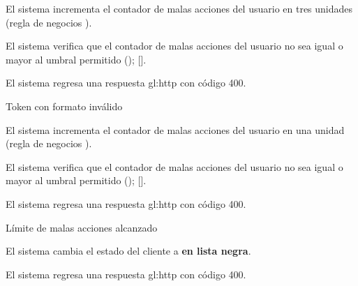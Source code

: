 {\begin{trayectoriaAlternativa}
    \item El sistema incrementa el contador de malas acciones del usuario
      en tres unidades (regla de negocios
      ).
    \item El sistema verifica que el contador de malas acciones del usuario no
      sea igual o mayor al umbral permitido
      ();
      [].

    \item El sistema regresa una respuesta \gls{gl:http} con código 400.

  \end{trayectoriaAlternativa}


  \begin{trayectoriaAlternativa}
    {Token con formato inválido}

    \item El sistema incrementa el contador de malas acciones del usuario
      en una unidad (regla de negocios ).
    \item El sistema verifica que el contador de malas acciones del usuario no
      sea igual o mayor al umbral permitido
      ();
      [].

    \item El sistema regresa una respuesta \gls{gl:http} con código 400.

  \end{trayectoriaAlternativa}


  \begin{trayectoriaAlternativa}
    {Límite de malas acciones alcanzado}

    \item El sistema cambia el estado del cliente a \textbf{en lista negra}.

    \item El sistema regresa una respuesta \gls{gl:http} con código 400.

  \end{trayectoriaAlternativa}

}
